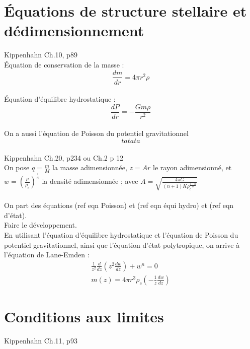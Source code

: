 \documentclass[a4paper,10pt]{article}
\begin{document}
\newpage
\section{Équations de structure stellaire et dédimensionnement}
Kippenhahn Ch.10, p89\\
Équation de conservation de la masse :
\begin{equation}
\frac{d m}{d r} = 4 \pi r^2 \rho
\end{equation}
\\
Équation d'équilibre hydrostatique :
\begin{equation}
\frac{d P}{d r} = - \frac{G m \rho}{r^2}
\end{equation}
\\
On a aussi l'équation de Poisson du potentiel gravitationnel\\
\begin{equation}
tatata
\end{equation}
\\

Kippenhahn Ch.20, p234 ou Ch.2 p 12\\
On pose $q=\frac{m}{M}$ la masse adimensionnée, $z=A r$ le rayon adimensionné, et $w=(\frac{\rho}{\rho_c})^{\frac{1}{n}}$ la densité adimensionnée ; avec $A=\sqrt{\frac{4 \pi G}{(n+1) K \rho_c^{\frac{1-n}{n}}}}$ \\
\\
On part des équations (ref eqn Poisson) et (ref eqn équi hydro) et (ref eqn d'état).\\
Faire le développement.\\

En utilisant l'équation d'équilibre hydrostatique et l'équation de Poisson du potentiel gravitationnel, ainsi que l'équation d'état polytropique, on arrive à l'équation de Lane-Emden :\\
\begin{eqnarray}
\frac{1}{z^2}\frac{d}{dz}(z^2 \frac{d w}{dz}) + w^n=0\\
m(z)=4 \pi r^3 \rho_c \left(- \frac{1}{z} \frac{dw}{dz}\right)
\end{eqnarray}

\newpage
\section{Conditions aux limites}
Kippenhahn Ch.11, p93
\end{document}
